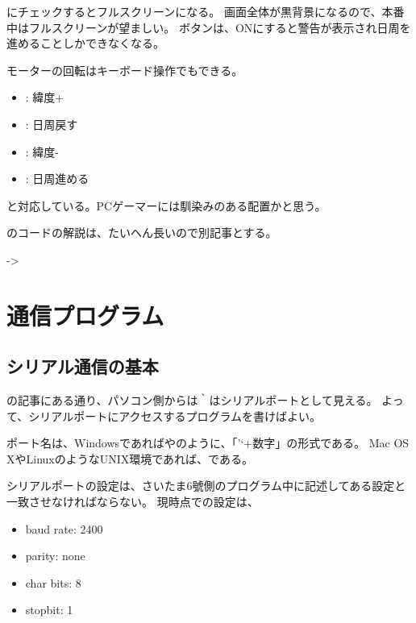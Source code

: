 \documentclass[letterpaper,10pt,dvipdfmx]{sphinxmanual}
\begin{document}
 にチェックするとフルスクリーンになる。
画面全体が黒背景になるので、本番中はフルスクリーンが望ましい。
 ボタンは、ONにすると警告が表示され日周を進めることしかできなくなる。

モーターの回転はキーボード操作でもできる。
\begin{itemize}
\item {} 
: 緯度+

\item {} 
: 日周戻す

\item {} 
: 緯度-

\item {} 
: 日周進める

\end{itemize}

と対応している。PCゲーマーには馴染みのある配置かと思う。

のコードの解説は、たいへん長いので別記事とする。

-\textgreater{} {\hyperref[\detokenize{nissyu-idohen/pc-software-code::doc}]{}}


\section{通信プログラム}
\label{\detokenize{nissyu-idohen/pc-software:}}\label{\detokenize{nissyu-idohen/pc-software:id5}}

\subsection{シリアル通信の基本}
\label{\detokenize{nissyu-idohen/pc-software:}}\label{\detokenize{nissyu-idohen/pc-software:id6}}
の記事にある通り、パソコン側からは｀はシリアルポートとして見える。
よって、シリアルポートにアクセスするプログラムを書けばよい。

ポート名は、Windowsであればやのように、「'`+数字」の形式である。
Mac OS XやLinuxのようなUNIX環境であれば、である。

シリアルポートの設定は、さいたま6號側のプログラム中に記述してある設定と一致させなければならない。
現時点での設定は、
\begin{itemize}
\item {} 
baud rate: 2400

\item {} 
parity: none

\item {} 
char bits: 8

\item {} 
stopbit: 1

\end{itemize}
\end{document}
